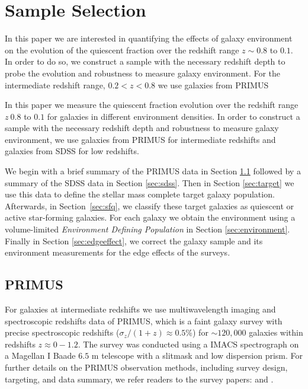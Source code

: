 \documentclass{emulateapj}
\begin{document}
\section{Sample Selection} \label{sec:sample}
In this paper we are interested in quantifying the effects of galaxy environment on the evolution of the quiescent fraction over the redshift range $z \sim 0.8$ to $0.1$. In order to do so, we construct a sample with the necessary redshift depth to probe the evolution and robustness to measure galaxy environment. For the intermediate redshift range, $0.2 < z < 0.8$ we use galaxies from PRIMUS

In this paper we measure the quiescent fraction evolution over the redshift range $z ~ 0.8$ to $0.1$ for galaxies in different environment densities. In order to construct a sample with the necessary redshift depth and robustness to measure galaxy environment, we use galaxies from PRIMUS for intermediate redshifts and galaxies from SDSS for low redshifts. 

We begin with a brief summary of the PRIMUS data in Section \ref{sec:primus} followed by a summary of the SDSS data in Section \ref{sec:sdss}.
Then in Section \ref{sec:target} we use this data to define the stellar mass complete target galaxy population.
Afterwards, in Section~\ref{sec:sfq}, we classify these target galaxies as quiescent or active star-forming galaxies. 
For each galaxy we obtain the environment using a volume-limited {\em Environment Defining Population} in Section \ref{sec:environment}. 
Finally in Section \ref{sec:edgeeffect}, we correct the galaxy sample and its environment measurements for the edge effects of the surveys. 

\subsection{PRIMUS} \label{sec:primus}
For galaxies at intermediate redshifts we use multiwavelength imaging and spectroscopic redshifts data of PRIMUS, which is a faint galaxy survey with precise spectroscopic redshifts ($\sigma_z/(1+z) \approx 0.5 \%$) for $\sim 120,000$ galaxies within redshifts $z \approx 0-1.2$.
The survey was conducted using a IMACS spectrograph on a Magellan I Baade $6.5$ m telescope with a slitmask and low dispersion prism.
For further details on the PRIMUS observation methods, including survey design, targeting, and data summary, we refer readers to the survey papers: \cite{Coil:2011aa} and \cite{Cool:2013aa}.
\end{document}
